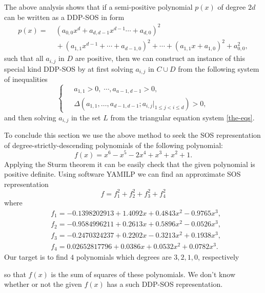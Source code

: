 \documentclass[runningheads]{llncs}
\newcommand{\Qo}{\Delta}
\begin{document}
The above analysis shows that if a semi-positive polynomial $p(x)$ of degree $2d$ can be written as a DDP-SOS in form
\begin{align}
p(x)=&\; (a_{0,0}x^d+a_{d,d-1}x^{d-1}\cdots+a_{d,0})^2\nonumber \\
&\;+(a_{1,1}x^{d-1}+\cdots+a_{d-1,0})^2+\cdots+
(a_{1,1}x+a_{1,0})^2+a_{0,0}^2,
\label{ddp-sos-a}
\end{align}
such that all $a_{i,j}$ in $D$ are positive, then we can construct 
an instance of this special kind DDP-SOS by at first solving 
$a_{i,j}$ in $C\cup D$ from the following system of inequalities
\begin{equation}
\left\{
\begin{array}{rl}
    &\;a_{1,1}> 0,\; \cdots, a_{a-1,d-1}> 0, \\[3pt]
    &\;{\Qo}(a_{1,1}, \ldots, a_{d-1,d-1}; a_{i,j}|_{1\leq j<i\leq d})>0,
\end{array}\right.
\label{the-ineqs}
\end{equation}
and then solving  $a_{i,j}$ in the set $L$ from the triangular equation system \eqref{the-eqs}.  
\medskip

To conclude this section we use the above method to seek the SOS representation of degree-strictly-descending polynomials of the following polynomial:
$$
f(x)=x^6-x^5-2x^4+x^3+x^2+1.
$$
Applying the Sturm theorem it can be easily check that the given polynomial is positive definite. 
Using software YAMILP we can find an approximate SOS representation 
$$
f=f_1^2+f_2^2+f_3^2+f_4^2
$$
where
\begin{align*}
&f_1 =-0.1398202913 + 1.4092x + 0.4843x^2 - 0.9765x^3, \\
&f_2 =-0.9584996211 + 0.2613x + 0.5896x^2 - 0.0526x^3,\\
&f_3 =-0.2470324237 + 0.2202x - 0.3213x^2 + 0.1938x^3,\\
&f_4 = 0.02652817796 + 0.0386x + 0.0532x^2 + 0.0782x^3.
\end{align*}
Our target is to find $4$ polynomials which degrees are $3,2,1,0$, respectively

so that $f(x)$ is the sum of squares of these polynomials.
We don't know whether or not the given $f(x)$ has a such DDP-SOS representation. 
\end{document}
